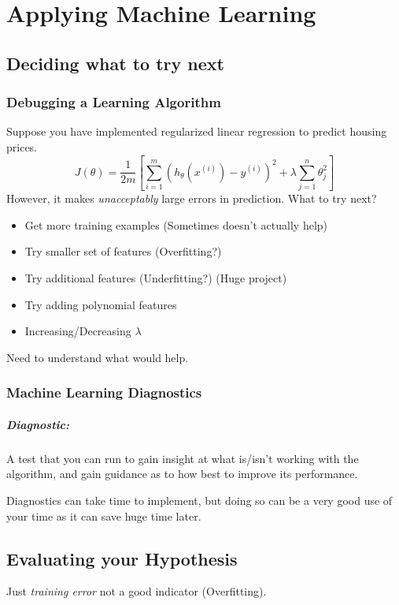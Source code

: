 \chapter{Applying Machine Learning}
\section{Deciding what to try next}
\subsection{Debugging a Learning Algorithm}
Suppose you have implemented regularized linear regression to predict housing prices.
\begin{equation*}
	J(\theta)  = \frac{1}{2m}\left[
		\sum_{i=1}^m\left(
		h_\theta(x^{(i)}) - y^{(i)}
		\right)^2 + \lambda\sum_{j=1}^n\theta_j^2
		\right]
\end{equation*}
However, it makes \emph{unacceptably} large errors in prediction. What to try next?
\begin{itemize}
	\item Get more training examples (Sometimes doesn't actually help)
	\item Try smaller set of features (Overfitting?)
	\item Try additional features (Underfitting?) (Huge project)
	\item Try adding polynomial features
	\item Increasing/Decreasing $\lambda$
\end{itemize}
Need to understand what would help.

\subsection{Machine Learning Diagnostics}
\paragraph{Diagnostic:} A test that you can run to gain insight at what is/isn't working
with the algorithm, and gain guidance as to how best to improve its performance.

Diagnostics can take time to implement, but doing so can be a very good use of your
time as it can save huge time later.

\section{Evaluating your Hypothesis}
Just \emph{training error} not a good indicator (Overfitting).

